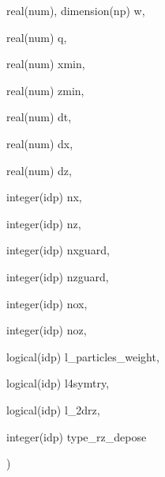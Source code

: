 {\begin{DoxyParamCaption}
\item[{real(num), dimension(np)}]{w, }
\item[{real(num)}]{q, }
\item[{real(num)}]{xmin, }
\item[{real(num)}]{zmin, }
\item[{real(num)}]{dt, }
\item[{real(num)}]{dx, }
\item[{real(num)}]{dz, }
\item[{integer(idp)}]{nx, }
\item[{integer(idp)}]{nz, }
\item[{integer(idp)}]{nxguard, }
\item[{integer(idp)}]{nzguard, }
\item[{integer(idp)}]{nox, }
\item[{integer(idp)}]{noz, }
\item[{logical(idp)}]{l\+\_\+particles\+\_\+weight, }
\item[{logical(idp)}]{l4symtry, }
\item[{logical(idp)}]{l\+\_\+2drz, }
\item[{integer(idp)}]{type\+\_\+rz\+\_\+depose}
\end{DoxyParamCaption}
)}\hypertarget{current__deposition__2d_8_f90_a8b3dd693be6a41b342722e15aa4880de}{}\label{current__deposition__2d_8_f90_a8b3dd693be6a41b342722e15aa4880de}
